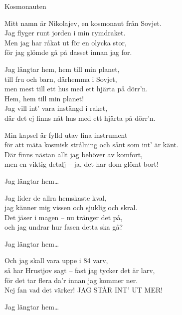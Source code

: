 \begin{song}{Kosmonauten}
	
	
	

    \showversenumber	
	Mitt namn är Nikolajev, en kosmonaut från Sovjet.\\
	Jag flyger runt jorden i min rymdraket.\\
	Men jag har råkat ut för en olycka stor,\\
	för jag glömde gå på dasset innan jag for.
	
	Jag längtar hem, hem till min planet,\\
	till fru och barn, därhemma i Sovjet,\\
	men mest till ett hus med ett hjärta på dörr'n.\\
	Hem, hem till min planet!\\
	Jag vill int' vara instängd i raket,\\
	där det ej finns nåt hus med ett hjärta på dörr'n.
	
    \showversenumber
	Min kapsel är fylld utav fina instrument\\
	för att mäta kosmisk strålning och sånt som int' är känt.\\
	Där finns nästan allt jag behöver av komfort,\\
	men en viktig detalj -- ja, det har dom glömt bort!
	
	Jag längtar hem\ldots{}
	
    \showversenumber
	Jag lider de allra hemskaste kval,\\
	jag känner mig vissen och sjuklig och skral.\\
	Det jäser i magen -- nu tränger det på,\\
	och jag undrar hur fasen detta ska gå?
	
	Jag längtar hem\ldots{}
	
    \showversenumber
	Och jag skall vara uppe i 84 varv,\\
	så har Hrustjov sagt -- fast jag tycker det är larv,\\
	för det tar flera da'r innan jag kommer ner.\\
	Nej fan vad det värker! JAG STÅR INT' UT MER!
	
	Jag längtar hem\ldots{}
	
\end{song}
